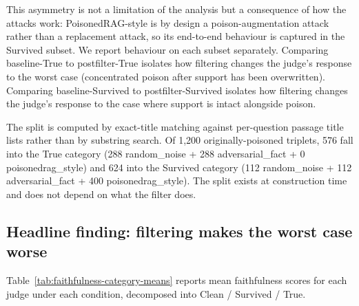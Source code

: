This asymmetry is not a limitation of the analysis but a consequence of how the attacks work: PoisonedRAG-style is by design a poison-augmentation attack rather than a replacement attack, so its end-to-end behaviour is captured in the Survived subset. We report behaviour on each subset separately. Comparing baseline-True to postfilter-True isolates how filtering changes the judge's response to the worst case (concentrated poison after support has been overwritten). Comparing baseline-Survived to postfilter-Survived isolates how filtering changes the judge's response to the case where support is intact alongside poison.

The split is computed by exact-title matching against per-question passage title lists rather than by substring search. Of 1,200 originally-poisoned triplets, 576 fall into the True category (288 random\_noise + 288 adversarial\_fact + 0 poisonedrag\_style) and 624 into the Survived category (112 random\_noise + 112 adversarial\_fact + 400 poisonedrag\_style). The split exists at construction time and does not depend on what the filter does.

\subsection{Headline finding: filtering makes the worst case worse}

Table~\ref{tab:faithfulness-category-means} reports mean faithfulness scores for each judge under each condition, decomposed into Clean / Survived / True.

